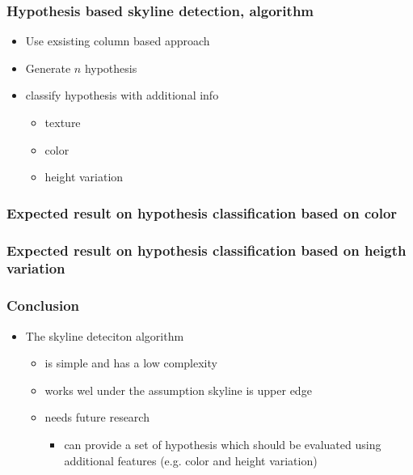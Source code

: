 \documentclass{beamer}
\begin{document}
\frame
{
	\frametitle{Hypothesis based skyline detection, algorithm}
	\begin{itemize}
	\item <+-| alert@+> Use exsisting column based approach
	\item <+-| alert@+> Generate $n$ hypothesis
	\item <+-| alert@+> classify hypothesis with additional info
		\begin{itemize}
		\item <+-| alert@+> texture 
		\item <+-| alert@+> color
		\item <+-| alert@+> height variation 
		\end{itemize}
	\end{itemize}
}

\frame
{
	\frametitle{Expected result on hypothesis classification based on color}
}

\frame
{
	\frametitle{Expected result on hypothesis classification based on heigth variation}
}

\frame
{
	\frametitle{Conclusion}
	\begin{itemize}
	\item <+-| alert@+> The skyline deteciton algorithm 
		\begin{itemize}
		\item <+-| alert@+> is simple and has a low complexity
		\item <+-| alert@+> works wel under the assumption skyline is upper edge
		\item <+-| alert@+> needs future research
			\begin{itemize}
			\item <+-| alert@+> can provide a set of hypothesis which should be evaluated using additional features
			(e.g. color and height variation)
			\end{itemize}
		\end{itemize}
	\end{itemize}
}

\end{document}
